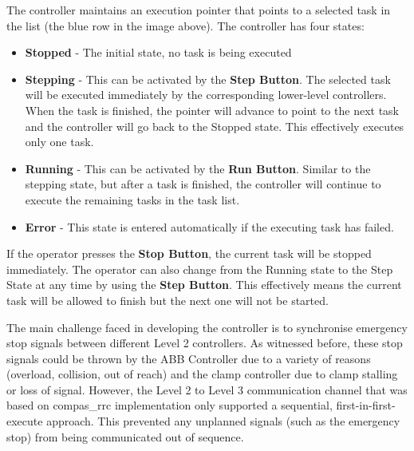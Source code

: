 The controller maintains an execution pointer that points to a selected task in the list (the blue row in the image above). The controller has four states:

\begin{itemize}
	\item \textbf{Stopped }- The initial state, no task is being executed

	\item \textbf{Stepping }- This can be activated by the \textbf{Step Button}. The selected task will be executed immediately by the corresponding lower-level controllers. When the task is finished, the pointer will advance to point to the next task and the controller will go back to the Stopped state. This effectively executes only one task.

	\item \textbf{Running }- This can be activated by the \textbf{Run Button}. Similar to the stepping state, but after a task is finished, the controller will continue to execute the remaining tasks in the task list.

	\item \textbf{Error }- This state is entered automatically if the executing task has failed.

\end{itemize}
If the operator presses the \textbf{Stop Button}, the current task will be stopped immediately. The operator can also change from the Running state to the Step State at any time by using the \textbf{Step Button}. This effectively means the current task will be allowed to finish but the next one will not be started. 


The main challenge faced in developing the controller is to synchronise emergency stop signals between different Level 2 controllers. As witnessed before, these stop signals could be thrown by the ABB Controller due to a variety of reasons (overload, collision, out of reach) and the clamp controller due to clamp stalling or loss of signal. However, the Level 2 to Level 3 communication channel that was based on compas\_rrc implementation only supported a sequential, first-in-first-execute approach. This prevented any unplanned signals (such as the emergency stop) from being communicated out of sequence.

